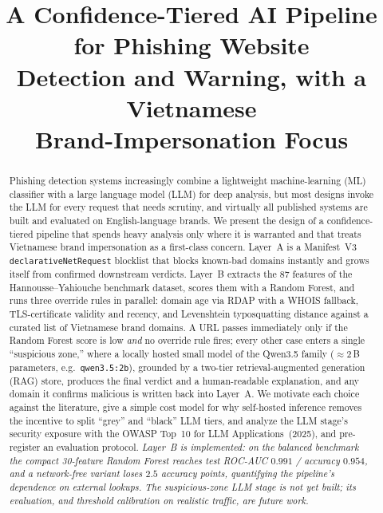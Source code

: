 \documentclass[conference]{IEEEtran}
\begin{document}
\title{A Confidence-Tiered AI Pipeline for Phishing Website\\ Detection and Warning, with a Vietnamese\\ Brand-Impersonation Focus}

\author{
}

\maketitle

\begin{abstract}
Phishing detection systems increasingly combine a lightweight machine-learning
(ML) classifier with a large language model (LLM) for deep analysis, but most
designs invoke the LLM for every request that needs scrutiny, and virtually all
published systems are built and evaluated on English-language brands. We present
the design of a confidence-tiered pipeline that spends heavy analysis only where
it is warranted and that treats Vietnamese brand impersonation as a first-class
concern. Layer~A is a Manifest~V3 \texttt{declarativeNetRequest} blocklist that
blocks known-bad domains instantly and grows itself from confirmed downstream
verdicts. Layer~B extracts the 87 features of the Hannousse--Yahiouche benchmark
dataset, scores them with a Random Forest, and runs three override rules in
parallel: domain age via RDAP with a WHOIS fallback, TLS-certificate validity and
recency, and Levenshtein typosquatting distance against a curated list of
Vietnamese brand domains. A URL passes immediately only if the Random Forest
score is low \emph{and} no override rule fires; every other case enters a single
``suspicious zone,'' where a locally hosted small model of the Qwen3.5 family
($\approx$2\,B parameters, e.g.\ \texttt{qwen3.5:2b}), grounded by a two-tier
retrieval-augmented generation (RAG) store, produces the final verdict and a
human-readable explanation, and any domain it confirms malicious is written back
into Layer~A. We motivate each choice against the literature, give a simple cost
model for why self-hosted inference removes the incentive to split ``grey'' and
``black'' LLM tiers, and analyze the LLM stage's security exposure with the OWASP
Top~10 for LLM Applications~(2025), and pre-register an evaluation protocol.
\emph{Layer~B is implemented: on the balanced benchmark the compact
30-feature Random Forest reaches test ROC-AUC $0.991$ / accuracy $0.954$, and a
network-free variant loses $2.5$ accuracy points, quantifying the pipeline's
dependence on external lookups. The suspicious-zone LLM stage is not yet built;
its evaluation, and threshold calibration on realistic traffic, are future work.}
\end{abstract}
\end{document}
